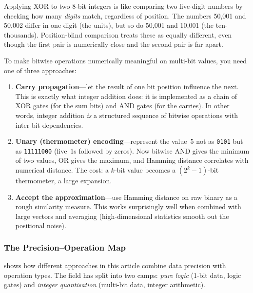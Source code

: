 \begin{analogy}
Applying XOR to two 8-bit integers is like comparing two
five-digit numbers by checking how many \emph{digits} match,
regardless of position. The numbers 50{,}001 and 50{,}002 differ
in one digit (the units), but so do 50{,}001 and 10{,}001 (the
ten-thousands). Position-blind comparison treats these as equally
different, even though the first pair is numerically close and the
second pair is far apart.
\end{analogy}

To make bitwise operations numerically meaningful on multi-bit
values, you need one of three approaches:

\begin{enumerate}[leftmargin=2em]
  \item \textbf{Carry propagation}---let the result of one bit
    position influence the next. This is exactly what integer
    addition does: it is implemented as a chain of XOR gates (for
    the sum bits) and AND gates (for the carries). In other words,
    integer addition \emph{is} a structured sequence of bitwise
    operations with inter-bit dependencies.

  \item \textbf{Unary (thermometer) encoding}---represent the
    value~5 not as \texttt{0101} but as \texttt{11111000} (five~1s
    followed by zeros). Now bitwise AND gives the minimum of two
    values, OR gives the maximum, and Hamming distance correlates
    with numerical distance. The cost: a $k$-bit value becomes a
    $(2^k - 1)$-bit thermometer, a large expansion.

  \item \textbf{Accept the approximation}---use Hamming distance on
    raw binary as a rough similarity measure. This works
    surprisingly well when combined with large vectors and
    averaging (high-dimensional statistics smooth out the
    positional noise).
\end{enumerate}

\subsubsection{The Precision--Operation Map}

 shows how different approaches in this
article combine data precision with operation types. The field has
split into two camps: \emph{pure logic} (1-bit data, logic gates)
and \emph{integer quantisation} (multi-bit data, integer arithmetic).

